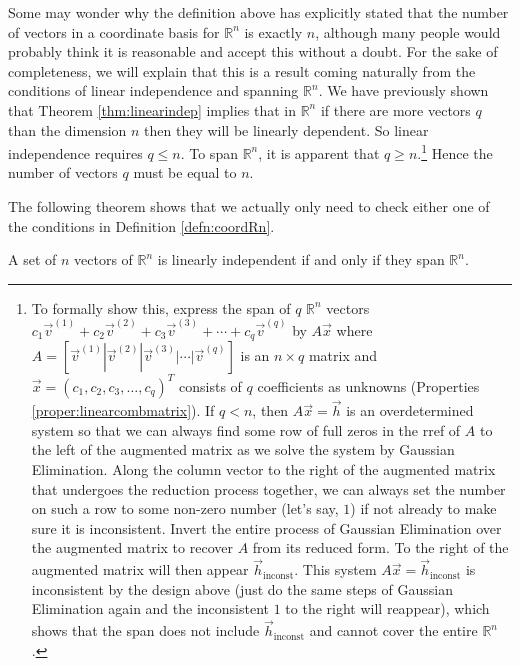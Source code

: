 Some may wonder why the definition above has explicitly stated that the number of vectors in a coordinate basis for $\mathbb{R}^n$ is exactly $n$, although many people would probably think it is reasonable and accept this without a doubt. For the sake of completeness, we will explain that this is a result coming naturally from the conditions of linear independence and spanning $\mathbb{R}^n$. We have previously shown that Theorem \ref{thm:linearindep} implies that in $\mathbb{R}^n$ if there are more vectors $q$ than the dimension $n$ then they will be linearly dependent. So linear independence requires $q \leq n$. To span $\mathbb{R}^n$, it is apparent that $q \geq n$.\footnote{
\label{foot:inconsth}
To formally show this, express the span of $q$ $\mathbb{R}^n$ vectors $c_1\vec{v}^{(1)} + c_2\vec{v}^{(2)} + c_3\vec{v}^{(3)} + \cdots + c_q\vec{v}^{(q)}$ by $A\vec{x}$ where $A = [\vec{v}^{(1)}|\vec{v}^{(2)}|\vec{v}^{(3)}|\cdots|\vec{v}^{(q)}]$ is an $n \times q$ matrix and $\vec{x} = (c_1, c_2, c_3, \ldots, c_q)^T$ consists of $q$ coefficients as unknowns (Properties \ref{proper:linearcombmatrix}). If $q < n$, then $A\vec{x} = \vec{h}$ is an overdetermined system so that we can always find some row of full zeros in the rref of $A$ to the left of the augmented matrix as we solve the system by Gaussian Elimination. Along the column vector to the right of the augmented matrix that undergoes the reduction process together, we can always set the number on such a row to some non-zero number (let's say, $1$) if not already to make sure it is inconsistent. Invert the entire process of Gaussian Elimination over the augmented matrix to recover $A$ from its reduced form. To the right of the augmented matrix will then appear $\vec{h}_{\text{inconst}}$. This system $A\vec{x} = \vec{h}_{\text{inconst}}$ is inconsistent by the design above (just do the same steps of Gaussian Elimination again and the inconsistent $1$ to the right will reappear), which shows that the span does not include $\vec{h}_{\text{inconst}}$ and cannot cover the entire $\mathbb{R}^n$.} Hence the number of vectors $q$ must be equal to $n$. \par
The following theorem shows that we actually only need to check either one of the conditions in Definition \ref{defn:coordRn}.
\begin{thm}
\label{thm:linindspan}
A set of $n$ vectors of $\mathbb{R}^n$ is linearly independent if and only if they span $\mathbb{R}^n$.
\end{thm}
